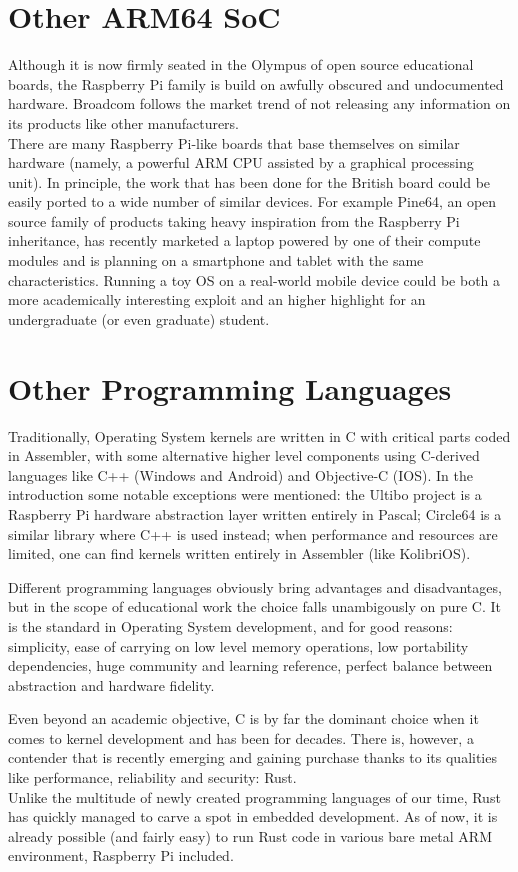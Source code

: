 \documentclass[12pt,a4paper,openright,twoside]{report}
\begin{document}
\section{Other ARM64 SoC}
Although it is now firmly seated in the Olympus of open source educational boards,
the Raspberry Pi family is build on awfully obscured and undocumented hardware.
Broadcom follows the market trend of not releasing any information on its 
products like other manufacturers.\\

There are many Raspberry Pi-like boards that base themselves on similar hardware
(namely, a powerful ARM CPU assisted by a graphical processing unit). In principle,
the work that has been done for the British board could be easily ported to a 
wide number of similar devices. For example Pine64, an open source family of products
taking heavy inspiration from the Raspberry Pi inheritance, has recently
marketed a laptop powered by one of their compute modules and is planning on 
a smartphone and tablet with the same characteristics. Running a toy
OS on a real-world mobile device could be both a more academically interesting 
exploit and an higher highlight for an undergraduate (or even graduate) student.

\section{Other Programming Languages}
Traditionally, Operating System kernels are written in C with critical parts
coded in Assembler, with some alternative higher level components using C-derived 
languages like C++ (Windows and Android) and Objective-C (IOS).
In the introduction some notable exceptions were mentioned: the Ultibo project 
\cite{ultibo} is a Raspberry Pi hardware abstraction layer written entirely in 
Pascal; Circle64 \cite{circle} is a similar library where C++ is used instead;
 when performance and resources are limited, one can find kernels written
entirely in Assembler (like KolibriOS).

Different programming languages obviously bring advantages and disadvantages,
but in the scope of educational work the choice falls unambigously on pure C.
It is the standard in Operating System development, and for good reasons:
simplicity, ease of carrying on low level memory operations, low portability 
dependencies, huge community and learning reference, perfect balance 
between abstraction and hardware fidelity.

Even beyond an academic objective, C is by far the dominant choice when it 
comes to kernel development and has been for decades. There is, however, a
contender that is recently emerging and gaining purchase thanks to its qualities
like performance, reliability and security: Rust.\\
Unlike the multitude of newly created programming languages of our time, Rust
has quickly managed to carve a spot in embedded development. As of now, it is 
already possible (and fairly easy) to run Rust code in various bare metal ARM
environment, Raspberry Pi included.
\end{document}
